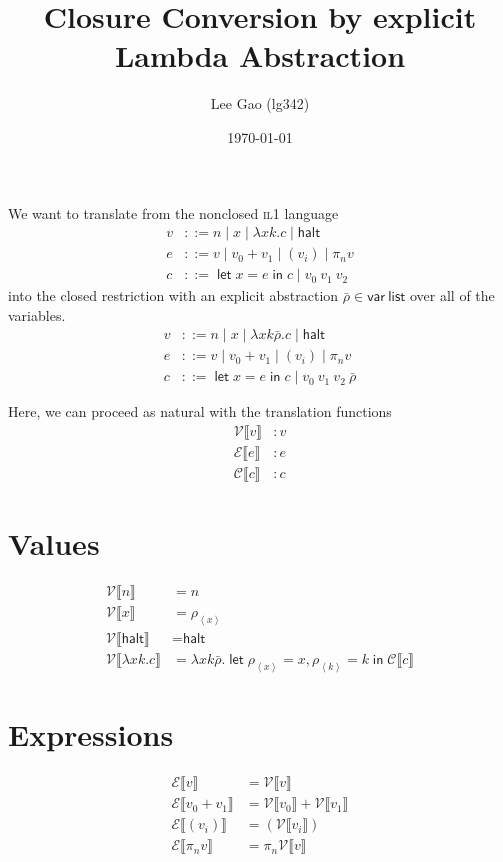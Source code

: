 \documentclass[11pt,a4paper]{article}
\author{Lee Gao (lg342)}
\title{Closure Conversion by explicit Lambda Abstraction}
\date{\today}
\newcommand {\coo} [1] {\ensuremath{\operatorname{\mathsf{#1}}}}
\newcommand{\Let}[1]{\coo{let} #1 \coo{in} }
\newcommand{\ba}[1]{\left\langle #1\right\rangle}
\newcommand{\f}[1]{\textsc{#1}}
\newcommand{\g}[1]{\textsf{#1}}
\newcommand{\trans}[2]{\ensuremath{\mathcal{#1}\llbracket #2\rrbracket}}
\begin{document}
\maketitle
\setlength{\parindent}{0pt}

We want to translate from the nonclosed \f{il1} language
\begin{align*}
v &::= n \mid x \mid \lambda xk.c \mid \g{halt} \\
e &::= v \mid v_0 + v_1 \mid (v_i) \mid \pi_n v \\
c &::= \Let{x = e}{c} \mid v_0~v_1~v_2
\end{align*}
into the closed restriction with an explicit abstraction $\bar\rho \in \g{var}~\g{list}$ over all of the variables.
\begin{align*}
v &::= n \mid x \mid \lambda xk\bar\rho.c \mid \g{halt} \\
e &::= v \mid v_0 + v_1 \mid (v_i) \mid \pi_n v \\
c &::= \Let{x = e}{c} \mid v_0~v_1~v_2~\bar\rho
\end{align*}

Here, we can proceed as natural with the translation functions
\begin{align*}
\trans{V}{v} &: v \\
\trans{E}{e} &: e \\
\trans{C}{c} &: c 
\end{align*}
\section{Values}
\begin{align*}
\trans{V}{n} &= n \\
\trans{V}{x} &= \rho_{\ba{x}} \\
\trans{V}{\g{halt}} &= \g{halt} \\
\trans{V}{\lambda xk.c} &= \lambda xk\bar\rho. \Let{\rho_{\ba{x}} = x, \rho_{\ba{k}} = k}{\trans{C}{c}}
\end{align*}
\section{Expressions}
\begin{align*}
\trans{E}{v} &= \trans{V}{v} \\
\trans{E}{v_0 + v_1} &= \trans{V}{v_0} + \trans{V}{v_1} \\
\trans{E}{(v_i)} &= (\trans{V}{v_i}) \\
\trans{E}{\pi_n v} &= \pi_n \trans{V}{v}
\end{align*}
\end{document}
